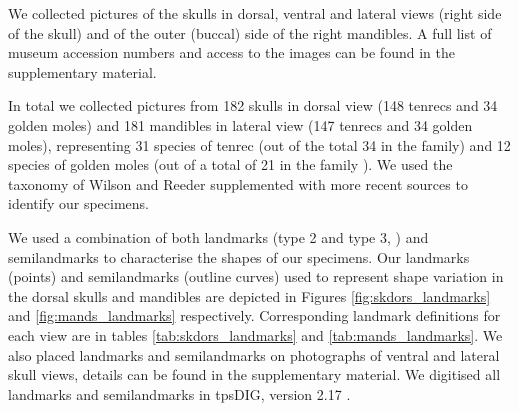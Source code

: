 \documentclass[12pt,a4paper]{article}
\begin{document}
We collected pictures of the skulls in dorsal, ventral and lateral views (right side of the skull) and of the outer (buccal) side of the right mandibles. A full list of museum accession numbers and access to the images can be found in the supplementary material.


In total we collected pictures from 182 skulls in dorsal view (148 tenrecs and 34 golden moles) and 181 mandibles in lateral view (147 tenrecs and 34 golden moles), representing 31 species of tenrec (out of the total 34 in the family) and 12 species of golden moles (out of a total of 21 in the family \citep{Asher2010}). We used the taxonomy of Wilson and Reeder \citeyearpar{Wilson2005} supplemented with more recent sources \citep{IUCN2012, Olson2013} to identify our specimens. 
	

We used a combination of both landmarks (type 2 and type 3, \citep{Zelditch2012}) and semilandmarks to characterise the shapes of our specimens. Our landmarks (points) and semilandmarks (outline curves) used to represent shape variation in the dorsal skulls and mandibles are depicted in Figures \ref{fig:skdors_landmarks} and \ref{fig:mands_landmarks} respectively. Corresponding landmark definitions for each view are in tables \ref{tab:skdors_landmarks} and \ref{tab:mands_landmarks}. We also placed landmarks and semilandmarks on photographs of ventral and lateral skull views, details can be found in the supplementary material. We digitised all landmarks and semilandmarks in tpsDIG, version 2.17 \citep{Rohlf2013}.
\end{document}

